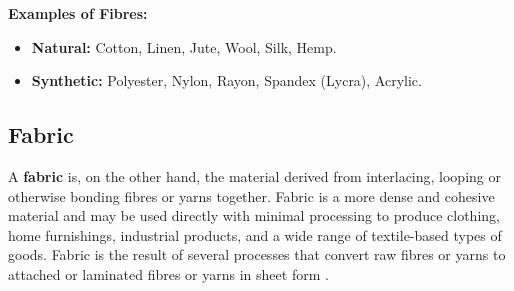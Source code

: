 \textbf{Examples of Fibres:}
\begin{itemize}[noitemsep, topsep=0pt]
    \item \textbf{Natural:} Cotton, Linen, Jute, Wool, Silk, Hemp.
    \item \textbf{Synthetic:} Polyester, Nylon, Rayon, Spandex (Lycra), Acrylic.
\end{itemize}

\subsection{Fabric}

A \textbf{fabric} is, on the other hand, the material derived from interlacing, looping or otherwise bonding fibres or yarns together. Fabric is a more dense and cohesive material and may be used directly with minimal processing to produce clothing, home furnishings, industrial products, and a wide range of textile-based types of goods. Fabric is the result of several processes that convert raw fibres or yarns to attached or laminated fibres or yarns in sheet form \cite{researchgate, hong2024research}.

